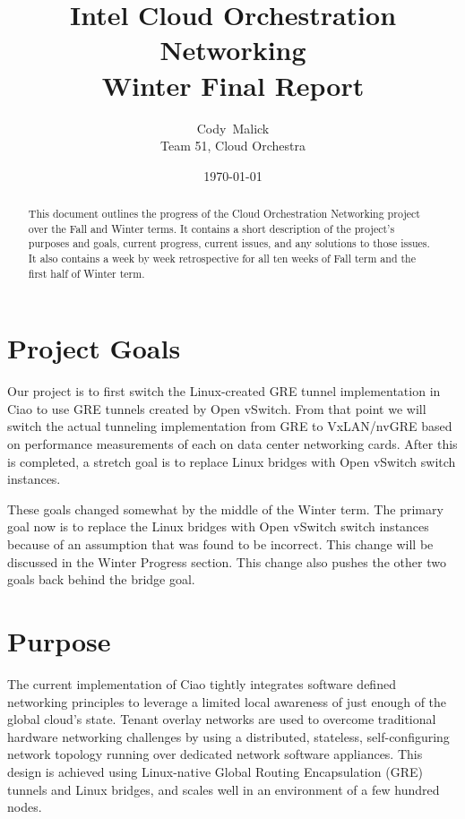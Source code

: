 \documentclass[10pt,onecolumn,journal,draftclsnofoot]{IEEEtran}
\begin{document}
\begin{titlepage}
	\title{Intel Cloud Orchestration Networking\\ Winter Final Report}
	\author{Cody~Malick\\
		Team 51, Cloud Orchestra}
	\date{\today}
	\maketitle
	\vspace{4cm}
	\begin{abstract}
		\noindent This document outlines the progress of the Cloud
		Orchestration Networking project over the Fall and Winter
		terms. It contains a short description of the project's purposes
		and goals, current progress, current issues, and any solutions
		to those issues. It also contains a week by week retrospective
		for all ten weeks of Fall term and the first half of Winter
		term. \end{abstract}

\end{titlepage}
\tableofcontents
\clearpage

\section{Project Goals}

Our project is to first switch the Linux-created GRE tunnel implementation in
Ciao to use GRE tunnels created by Open vSwitch. From that point we will switch
the actual tunneling implementation from GRE to VxLAN/nvGRE based on performance
measurements of each on data center networking cards. After this is completed, a
stretch goal is to replace Linux bridges with Open vSwitch switch instances.

These goals changed somewhat by the middle of the Winter term. The primary goal
now is to replace the Linux bridges with Open vSwitch switch instances because
of an assumption that was found to be incorrect. This change will be discussed
in the Winter Progress section. This change also pushes the other two goals back
behind the bridge goal.

\section{Purpose}

The current implementation of Ciao tightly integrates software defined
networking principles to leverage a limited local awareness of just enough of
the global cloud's state. Tenant overlay networks are used to overcome
traditional hardware networking challenges by using a distributed, stateless,
self-configuring network topology running over dedicated network software
appliances. This design is achieved using Linux-native Global Routing
Encapsulation (GRE) tunnels and Linux bridges, and scales well in an environment
of a few hundred nodes.
\end{document}
